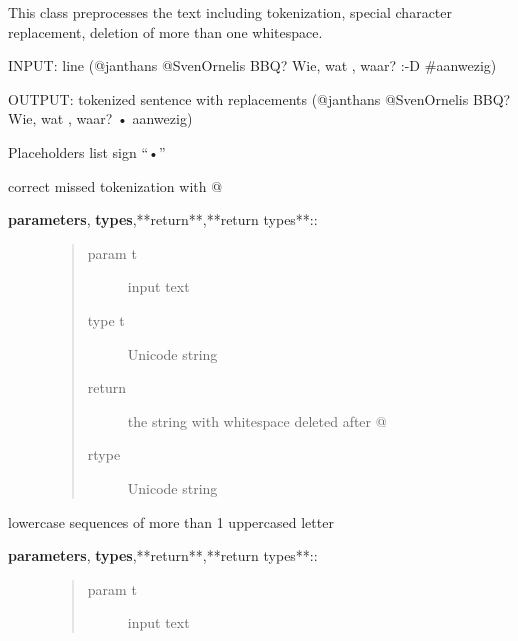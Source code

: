 \documentclass[letterpaper,10pt,english]{sphinxmanual}
\begin{document}
\label{API:module-norm.prepro.rewrite}

\begin{fulllineitems}
\label{API:norm.prepro.rewrite.Rewrite}
This class preprocesses the text including tokenization, special character replacement, 
deletion of more than one whitespace.

INPUT: line (@janthans @SvenOrnelis BBQ? Wie, wat , waar? :-D \#aanwezig)

OUTPUT: tokenized sentence with replacements (@janthans @SvenOrnelis BBQ? Wie, wat , waar? • aanwezig)

Placeholders list sign ``•''

\begin{fulllineitems}
\label{API:norm.prepro.rewrite.Rewrite.correct_at_tok}
correct missed tokenization with @
\begin{description}
\item[{\textbf{parameters}, \textbf{types},**return**,**return types**::}] \leavevmode\begin{quote}\begin{description}
\item[{param t}] \leavevmode
input text

\item[{type t}] \leavevmode
Unicode string

\item[{return}] \leavevmode
the string with whitespace deleted after @

\item[{rtype}] \leavevmode
Unicode string

\end{description}\end{quote}

\end{description}

\end{fulllineitems}


\begin{fulllineitems}
\label{API:norm.prepro.rewrite.Rewrite.reduce_allcaps}
lowercase sequences of more than 1 uppercased letter
\begin{description}
\item[{\textbf{parameters}, \textbf{types},**return**,**return types**::}] \leavevmode\begin{quote}\begin{description}
\item[{param t}] \leavevmode
input text


\end{description}
\end{quote}
\end{description}
\end{fulllineitems}
\end{fulllineitems}
\end{document}
